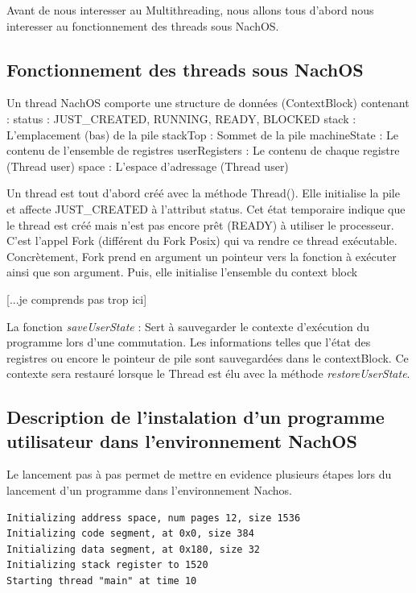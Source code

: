 \documentclass[a4paper,10pt]{article}
\begin{document}
Avant de nous interesser au Multithreading, nous allons tous d'abord nous
interesser au fonctionnement des threads sous NachOS.

\subsection{Fonctionnement des threads sous NachOS}

Un thread NachOS comporte une structure de données (ContextBlock) contenant :
status : JUST\_CREATED, RUNNING, READY, BLOCKED
stack : L'emplacement (bas) de la pile
stackTop : Sommet de la pile
machineState : Le contenu de l'ensemble de registres
userRegisters : Le contenu de chaque registre (Thread user)
space : L'espace d'adressage (Thread user)

Un thread est tout d'abord créé avec la méthode Thread(). Elle initialise la
pile et affecte JUST_CREATED à l'attribut status. Cet état temporaire indique
que le thread est créé mais n'est pas encore prêt (READY) à utiliser le
processeur. C'est l'appel Fork (différent du Fork Posix) qui va rendre ce
thread exécutable. Concrètement, Fork prend en argument un pointeur vers la
fonction à exécuter ainsi que son argument. Puis, elle initialise l'ensemble du
context block 

[...je comprends pas trop ici]

La fonction \textit{saveUserState} : Sert à sauvegarder le contexte d'exécution
du programme lors d'une commutation. Les informations telles que l'état des
registres ou encore le pointeur de pile sont sauvegardées dans le contextBlock.
Ce contexte sera restauré lorsque le Thread est élu avec la méthode
\textit{restoreUserState}.

\subsection{Description de l'instalation d'un programme utilisateur dans
l'environnement NachOS}

Le lancement pas à pas permet de mettre en evidence plusieurs étapes lors du
lancement d'un programme dans l'environnement Nachos.

\begin{lstlisting}
Initializing address space, num pages 12, size 1536
Initializing code segment, at 0x0, size 384
Initializing data segment, at 0x180, size 32
Initializing stack register to 1520
Starting thread "main" at time 10
\end{lstlisting}
\end{document}
